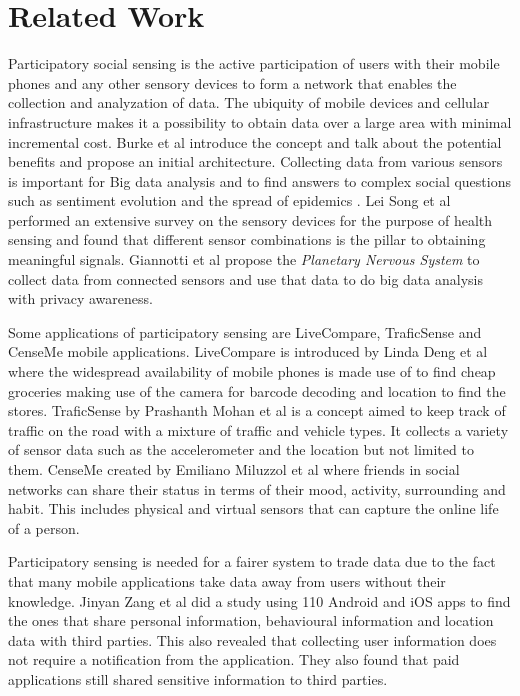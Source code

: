 \chapter{Related Work}

Participatory social sensing is the active participation of users with their mobile phones and any other sensory devices to form a network that enables the collection and analyzation of data. The ubiquity of mobile devices and cellular infrastructure makes it a possibility to obtain data over a large area with minimal incremental cost.
Burke et al introduce the concept \cite{burke2006participatory} and talk about the potential benefits and propose an initial architecture. Collecting data from various sensors is important for Big data analysis and to find answers to complex social questions such as sentiment evolution and the spread of epidemics \cite{giannotti2012planetary}. Lei Song et al \cite{song2014health} performed an extensive survey on the sensory devices for the purpose of health sensing and found that different sensor combinations is the pillar to obtaining meaningful signals. Giannotti et al \cite{giannotti2012planetary} propose the \textit{Planetary Nervous System} to collect data from connected sensors and use that data to do big data analysis with privacy awareness.

Some applications of participatory sensing are LiveCompare, TraficSense and CenseMe mobile applications. LiveCompare is introduced by Linda Deng et al
\cite{deng2009livecompare} where the widespread availability of mobile phones is made use of to find cheap groceries making use of the camera for barcode decoding and location to find the stores. TraficSense by Prashanth Mohan et al \cite{mohan2008nericell} is a concept aimed to keep track of traffic on the road with a mixture of traffic and vehicle types. It collects a variety of sensor data such as the accelerometer and the location but not limited to them. CenseMe created by Emiliano Miluzzol et al \cite{miluzzo2007cenceme} where friends in social networks can share their status in terms of their mood, activity, surrounding and habit. This includes physical and virtual sensors that can capture the online life of a person. 

Participatory sensing is needed for a fairer system to trade data due to the fact that many mobile applications take data away from users without their knowledge. Jinyan Zang et al
\cite{zang2015knows} did a study using 110 Android and iOS apps to find the ones that share personal information, behavioural information and location data with third parties. This also revealed that collecting user information does not require a notification from the application. They also found that paid applications still shared sensitive information to third parties. 

